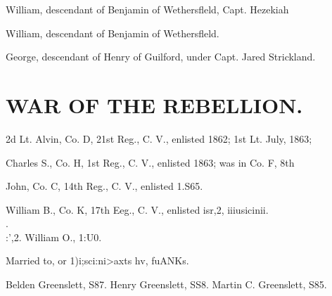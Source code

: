 \documentclass[oneside]{book}
\begin{document}
William, descendant of Benjamin of Wethersfleld, Capt. Hezekiah 

William, descendant of Benjamin of Wethersfleld. 







George, descendant of Henry of Guilford, under Capt. Jared Strickland. 







\section{WAR OF THE REBELLION.}

2d Lt. Alvin, Co. D, 21st Reg., C. V., enlisted 1862; 1st Lt. July, 1863; 


Charles S., Co. H, 1st Reg., C. V., enlisted 1863; was in Co. F, 8th 





John, Co. C, 14th Reg., C. V., enlisted 1.S65. 






William B., Co. K, 17th Eeg., C. V., enlisted isr,2, iiiusicinii. \\.\\:',2. 
William O., 1:U0. 

Married to, or 1)i;sci:ni>axts hv, fuANKs. 

Belden Greenslett, S87. 
Henry Greenslett, SS8. 
Martin C. Greenslett, S85. 
\end{document}

